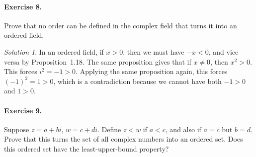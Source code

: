 \documentclass[11pt]{report}
\theoremstyle{remark}
\newtheorem*{solution}{Solution}
\begin{document}
    \paragraph{Exercise 8.} Prove that no order can be defined in the complex field
    that turns it into an ordered field.
    \begin{solution}
        In an ordered field, if $x > 0$, then we must have $-x < 0$, and vice versa
        by Proposition~1.18. The same proposition gives that if $x \neq 0$, then
        $x^2 > 0$. This forces $i^2 = -1 > 0$. Applying the same proposition again,
        this forces $(-1)^2 = 1 > 0$, which is a contradiction because we cannot
        have both $-1 > 0$ and $1 > 0$.
    \end{solution}
    
    \paragraph{Exercise 9.} Suppose $z = a + bi$, $w = c + di$. Define $z < w$ if $a
    < c$, and also if $a = c$ but $b = d$. Prove that this turns the set of all
    complex numbers into an ordered set. Does this ordered set have the
    least-upper-bound property?
\end{document}
